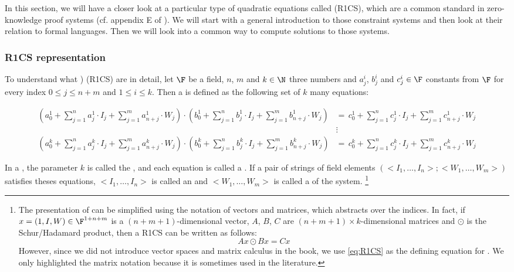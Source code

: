 In this section, we will have a closer look at a particular type of quadratic equations called  (R1CS), which are a common standard in zero-knowledge proof systems (cf. appendix E of \cite{sasson-2013}). We will start with a general introduction to those constraint systems and then look at their relation to formal languages. Then we will look into a common way to compute solutions to those systems. 

\subsubsection{R1CS representation} To understand what ) (R1CS) are in detail, let $\F$ be a field, $n$, $m$ and $k\in\N$ three numbers and $a_j^i$, $b_j^i$ and $c_j^i\in\F$ constants from $\F$ for every index $0\leq j \leq n+m$ and $1\leq i \leq k$. Then a  is defined as the following set of $k$ many equations: 

\begin{definition}\label{R1CS}
\begin{equation}\label{eq:R1CS}
\begin{split}
\scriptstyle\left(a^1_0 + \sum_{j=1}^n a^1_j \cdot I_j + \sum_{j=1}^m a^1_{n+j} \cdot W_j  \right) \cdot 
\left(b^1_0 + \sum_{j=1}^n b^1_j \cdot I_j + \sum_{j=1}^m b^1_{n+j} \cdot W_j  \right) &=\, 
\scriptstyle c^1_0 + \sum_{j=1}^n c^1_j \cdot I_j + \sum_{j=1}^m c^1_{n+j} \cdot W_j\\
       & \vdots\\
\scriptstyle\left(a^k_0 + \sum_{j=1}^n a^k_j \cdot I_j + \sum_{j=1}^m a^k_{n+j} \cdot W_j  \right) \cdot 
\left(b^k_0 + \sum_{j=1}^n b^k_j \cdot I_j + \sum_{j=1}^m b^k_{n+j} \cdot W_j  \right) &=\, 
\scriptstyle c^k_0 + \sum_{j=1}^n c^k_j \cdot I_j + \sum_{j=1}^m c^k_{n+j} \cdot W_j       
\end{split}
\end{equation}
\end{definition}

In a , the parameter $k$ is called the , and each equation is called a . If a pair of strings of field elements $(<I_1,\ldots, I_n>; <W_1,\ldots,W_m>)$  satisfies theses equations, $<I_1,\ldots, I_n>$ is called an  and $<W_1,\ldots,W_m>$ is called a  of the system.%
\footnote{The presentation of  can be simplified using the notation of vectors and matrices, which abstracts over the indices. In fact, if $x= (1,I,W)\in \F^{1+n+m}$ is a $(n+m+1)$-dimensional vector, $A$, $B$, $C$ are $(n+m+1)\times k$-dimensional matrices and $\odot$ is the Schur/Hadamard product, then a R1CS can be written as follows:
$$
Ax \odot Bx = Cx
$$
However,  since we did not introduce vector spaces and matrix calculus in the book, we use \ref{eq:R1CS} as the defining equation for . We only highlighted the matrix notation because it is sometimes used in the literature.}

